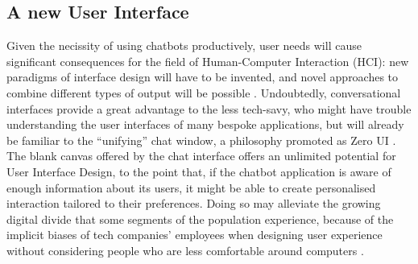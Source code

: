 \subsection{A new User Interface}
Given the necissity of using chatbots productively, user needs will cause significant consequences for the field of Human-Computer Interaction (HCI): new paradigms of interface design will have to be invented, and novel approaches to combine different types of output will be possible \cite{Følstad2017}. Undoubtedly, conversational interfaces provide a great advantage to the less tech-savy, who might have trouble understanding the user interfaces of many bespoke applications, but will already be familiar to the ``unifying'' chat window, a philosophy promoted as Zero UI \cite{zeroui}. The blank canvas offered by the chat interface offers an unlimited potential for User Interface Design, to the point that, if the chatbot application is aware of enough information about its users, it might be able to create personalised interaction tailored to their preferences. Doing so may alleviate the growing digital divide that some segments of the population experience, because of the implicit biases of tech companies' employees when designing user experience without considering people who are less comfortable around computers \cite{Brandtzaeg2011}.
